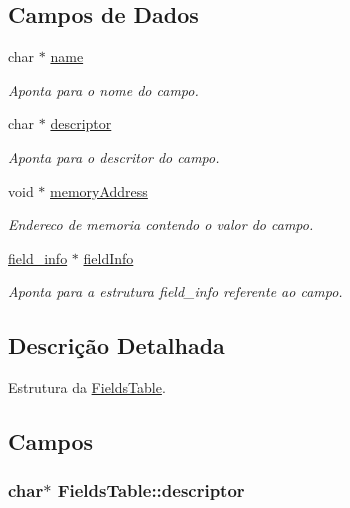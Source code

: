 \subsection*{Campos de Dados}
\begin{DoxyCompactItemize}
\item 
char $\ast$ \hyperlink{struct_fields_table_a931fde572e99face7e9cd2fbc29cd36e}{name}
\begin{DoxyCompactList}\small\item\em Aponta para o nome do campo. \end{DoxyCompactList}\item 
char $\ast$ \hyperlink{struct_fields_table_aa1cd4a61abe3e42fd3d2ce8e9a692924}{descriptor}
\begin{DoxyCompactList}\small\item\em Aponta para o descritor do campo. \end{DoxyCompactList}\item 
void $\ast$ \hyperlink{struct_fields_table_a5c251342633df2e314a6b88c25f2a604}{memory\+Address}
\begin{DoxyCompactList}\small\item\em Endereco de memoria contendo o valor do campo. \end{DoxyCompactList}\item 
\hyperlink{_e___j_v_m_8h_a53c0da222997bf70321f1aebc84d8e02}{field\+\_\+info} $\ast$ \hyperlink{struct_fields_table_a0d8937ba1f6023433e234337d5825315}{field\+Info}
\begin{DoxyCompactList}\small\item\em Aponta para a estrutura field\+\_\+info referente ao campo. \end{DoxyCompactList}\end{DoxyCompactItemize}


\subsection{Descrição Detalhada}
Estrutura da \hyperlink{struct_fields_table}{Fields\+Table}. 

\subsection{Campos}
\hypertarget{struct_fields_table_aa1cd4a61abe3e42fd3d2ce8e9a692924}{}
\subsubsection[{descriptor}]{\setlength{\rightskip}{0pt plus 5cm}char$\ast$ Fields\+Table\+::descriptor}\label{struct_fields_table_aa1cd4a61abe3e42fd3d2ce8e9a692924}


